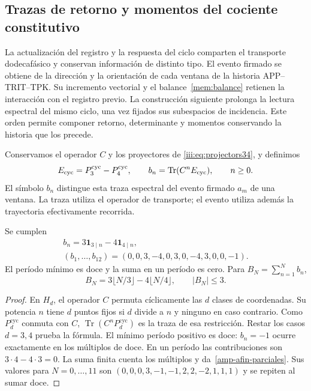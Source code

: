 \subsection{Trazas de retorno y momentos del cociente constitutivo}
\label{amp-afin-sec}

La actualización del registro y la respuesta del ciclo comparten el
transporte dodecafásico y conservan información de distinto tipo.
El evento firmado se obtiene de la dirección y la orientación de cada
ventana de la historia APP--TRIT--TPK. Su incremento vectorial y el
balance~\eqref{mem:balance} retienen la interacción con el registro previo.
La construcción siguiente prolonga la lectura espectral del mismo ciclo,
una vez fijados sus subespacios de incidencia. Este orden permite componer
retorno, determinante y momentos conservando la historia que los precede.

Conservamos el operador $C$ y los proyectores de
\eqref{iii:eq:projectors34}, y definimos
\begin{equation}
 E_{\rm cyc}=P_3^{\mathrm{cyc}}-P_4^{\mathrm{cyc}},\qquad
 b_n=\operatorname{Tr}(C^n E_{\rm cyc}),\qquad n\geq0.
 \label{amp-afin-trazas}
\end{equation}
El símbolo $b_n$ distingue esta traza espectral del evento firmado
$a_m$ de una ventana. La traza utiliza el operador de transporte; el
evento utiliza además la trayectoria efectivamente recorrida.

\begin{proposition}
\label{amp-afin-prop-tabla}
Se cumplen
\begin{equation}
 \begin{gathered}
 b_n=3\mathbf1_{3\mid n}-4\mathbf1_{4\mid n},\\
 (b_1,\ldots,b_{12})=(0,0,3,-4,0,3,0,-4,3,0,0,-1).
 \end{gathered}
 \label{amp-afin-tabla}
\end{equation}
El período mínimo es doce y la suma en un período es cero. Para
$B_N=\sum_{n=1}^{N}b_n$,
\begin{equation}
 B_N=3\lfloor N/3\rfloor-4\lfloor N/4\rfloor,\qquad |B_N|\leq3.
 \label{amp-afin-parciales}
\end{equation}
\end{proposition}
\begin{proof}
En $H_d$, el operador $C$ permuta cíclicamente las $d$ clases de
coordenadas. Su potencia $n$ tiene $d$ puntos fijos si $d$ divide a $n$
y ninguno en caso contrario. Como $P_d^{\mathrm{cyc}}$ conmuta con $C$,
$\operatorname{Tr}(C^nP_d^{\mathrm{cyc}})$ es la traza de esa restricción.
Restar los casos $d=3,4$ prueba la fórmula. El mínimo período positivo
es doce: $b_n=-1$ ocurre exactamente en los múltiplos de doce.
En un período las contribuciones son $3\cdot4-4\cdot3=0$.
La suma finita cuenta los múltiplos y da~\eqref{amp-afin-parciales}.
Sus valores para $N=0,\ldots,11$ son
$(0,0,0,3,-1,-1,2,2,-2,1,1,1)$ y se repiten al sumar doce.
\end{proof}

